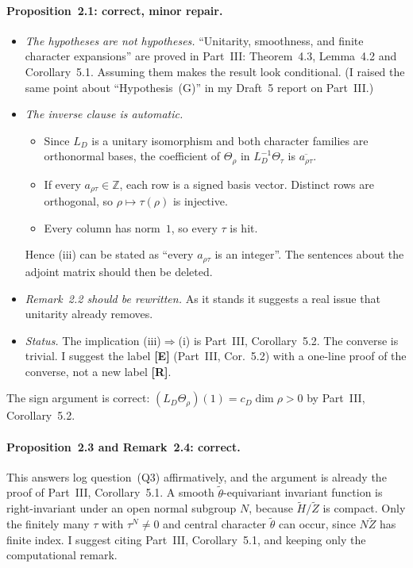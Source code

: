\documentclass[11pt]{article}
\newcommand{\tH}{\widetilde H}
\newcommand{\tZ}{\widetilde Z}
\theoremstyle{definition}
\begin{document}
\paragraph{Proposition~2.1: correct, minor repair.}
\begin{itemize}
\item \emph{The hypotheses are not hypotheses.} ``Unitarity, smoothness, and
finite character expansions'' are proved in Part~III: Theorem~4.3,
Lemma~4.2 and Corollary~5.1. Assuming them makes the result look
conditional. (I raised the same point about ``Hypothesis~(G)'' in my
Draft~5 report on Part~III.)
\item \emph{The inverse clause is automatic.}
\begin{itemize}
\item Since $L_D$ is a unitary isomorphism and both character families
are orthonormal bases, the coefficient of $\Theta_\rho$ in
$L_D^{-1}\Theta_\tau$ is $\overline{a_{\rho\tau}}$.
\item If every $a_{\rho\tau}\in\mathbb Z$, each row is a signed basis
vector. Distinct rows are orthogonal, so $\rho\mapsto\tau(\rho)$ is
injective.
\item Every column has norm~$1$, so every $\tau$ is hit.
\end{itemize}
Hence (iii) can be stated as ``every $a_{\rho\tau}$ is an integer''. The
sentences about the adjoint matrix should then be deleted.
\item \emph{Remark~2.2 should be rewritten.} As it stands it suggests a real
issue that unitarity already removes.
\item \emph{Status.} The implication (iii)$\Rightarrow$(i) is Part~III,
Corollary~5.2. The converse is trivial. I suggest the label
\textbf{[E]} (Part~III, Cor.~5.2) with a one-line proof of the converse,
not a new label \textbf{[R]}.
\end{itemize}
The sign argument is correct: $(L_D\Theta_\rho)(1)=c_D\dim\rho>0$ by
Part~III, Corollary~5.2.

\paragraph{Proposition~2.3 and Remark~2.4: correct.} This answers log
question~(Q3) affirmatively, and the argument is already the proof of
Part~III, Corollary~5.1. A smooth $\tilde\theta$-equivariant invariant
function is right-invariant under an open normal subgroup $N$, because
$\tH/\tZ$ is compact. Only the finitely many $\tau$ with $\tau^N\ne0$
and central character $\tilde\theta$ can occur, since $N\tZ$ has finite
index. I suggest citing Part~III, Corollary~5.1, and keeping only the
computational remark.
\end{document}
